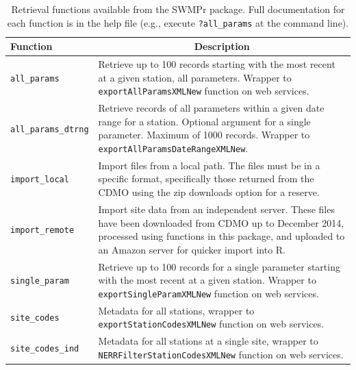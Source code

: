 \documentclass[10pt,letterpaper]{article}\usepackage[]{graphicx}\usepackage[]{color}
\begin{document}
\begin{table}[!tbp]
\caption{Retrieval functions available from the SWMPr package. Full documentation for each function is in the help file (e.g., execute \texttt{?all\_params} at the command line).\label{tab:retrieve}} 
\begin{center}
\begin{tabular}{lp{3.5in}}
\hline\hline
\multicolumn{1}{l}{Function}&\multicolumn{1}{c}{Description}\tabularnewline
\hline
\texttt{all\_params}&Retrieve up to 100 records starting with the most recent at a given station, all parameters.  Wrapper to \texttt{exportAllParamsXMLNew} function on web services.\tabularnewline
\texttt{all\_params\_dtrng}&Retrieve records of all parameters within a given date range for a station.  Optional argument for a single parameter.  Maximum of 1000 records. Wrapper to \texttt{exportAllParamsDateRangeXMLNew}.\tabularnewline
\texttt{import\_local}&Import files from a local path.  The files must be in a specific format, specifically those returned from the \ac{CDMO} using the zip downloads option for a reserve.\tabularnewline
\texttt{import\_remote}&Import site data from an independent server. These files have been downloaded from \ac{CDMO} up to December 2014, processed using functions in this package, and uploaded to an Amazon server for quicker import into R.\tabularnewline
\texttt{single\_param}&Retrieve up to 100 records for a single parameter starting with the most recent at a given station.  Wrapper to \texttt{exportSingleParamXMLNew} function on web services.\tabularnewline
\texttt{site\_codes}&Metadata for all stations, wrapper to \texttt{exportStationCodesXMLNew} function on web services.\tabularnewline
\texttt{site\_codes\_ind}&Metadata for all stations at a single site, wrapper  to \texttt{NERRFilterStationCodesXMLNew} function on web services.\tabularnewline
\hline
\end{tabular}\end{center}

\end{table}
\end{document}
